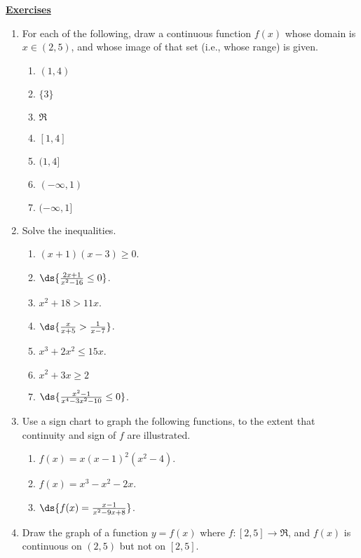 \eex
\newpage
\begin{center}
\underline{\Large{\bf Exercises}}\end{center}
\bigskip
\begin{multicols}{2}
\begin{enumerate}
\item For each of the following, draw a continuous
      function $f(x)$ whose domain is $x\in(2,5)$, 
      and whose image of that set (i.e., whose range)
      is given.
  \begin{multicols}{2}
  \begin{enumerate}
    \item $(1,4)$
    \item $\{3\}$
    \item $\Re$
    \item $[1,4]$
    \item $(1,4]$
    \item $(-\infty,1)$
    \item $(-\infty,1]$ \\
    
  \end{enumerate}
  \end{multicols}


\item Solve the inequalities.
  \begin{enumerate}
  \item $(x+1)(x-3)\ge0$.
  \item $\ds{\frac{2x+1}{x^2-16}\le0}$.
  \item $x^2+18>11x$.
  \item $\ds{\frac{x}{x+5}>\frac{1}{x-7}}$.
  \item $x^3+2x^2\le15x$.
  \item $x^2+3x\ge2$
  \item $\ds{\frac{x^2-1}{x^4-3x^2-10}\le0}$.
  \end{enumerate}
\item Use a sign chart to graph the following functions, to the
      extent that continuity and sign of $f$ are illustrated.
  \begin{enumerate}
  \item $f(x)=x(x-1)^2(x^2-4)$.
  \item $f(x)=x^3-x^2-2x$.
  \item $\ds{f(x)=\frac{x-1}{x^2-9x+8}}$.
  \end{enumerate}
\item Draw the graph of a function $y=f(x)$ where
      $f:[2,5]\longrightarrow\Re$, and 
      $f(x)$ is continuous on $(2,5)$ but not on $[2,5]$.
\end{enumerate}





\end{multicols}



